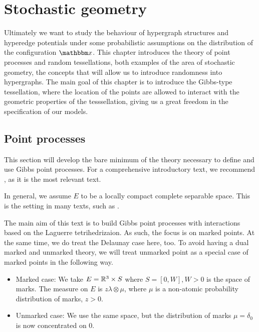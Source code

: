 \chapter{Stochastic geometry}
Ultimately we want to study the behaviour of hypergraph structures and hyperedge potentials under some probabilistic assumptions on the distribution of the configuration $\x$. This chapter introduces the theory of point processes and random tessellations, both examples of the area of stochastic geometry, the concepts that will allow us to introduce randomness into hypergraphs. The main goal of this chapter is to introduce the Gibbs-type tessellation, where the location of the points are allowed to interact with the geometric properties of the tesssellation, giving us a great freedom in the specification of our models.

\section{Point processes}
This section will develop the bare minimum of the theory necessary to define and use Gibbs point processes. For a comprehensive introductory text, we recommend \cite{MollerWaagepetersen2003}, as it is the most relevant text. 


In general, we assume $E$ to be a locally compact complete separable space. This is the setting in many texts, such as \cite{SchneiderWeil2008}.

The main aim of this text is to build Gibbs point processes with interactions based on the Laguerre tetrihedrizaion. As such, the focus is on marked points. At the same time, we do treat the Delaunay case here, too. To avoid having a dual marked and unmarked theory, we will treat unmarked point as a special case of marked points in the following way. 

\begin{itemize}
	\item Marked case: We take $E={\mathbb R^3}\times S$ where $S=[0,W],W>0$ is the space of marks. The measure on $E$ is $z\lambda \otimes \mu$, where $\mu$ is a non-atomic probability distribution of marks, $z>0$. 
	\item Unmarked case: We use the same space, but the distribution of marks $\mu=\delta_0$ is now concentrated on $0$.
\end{itemize}


